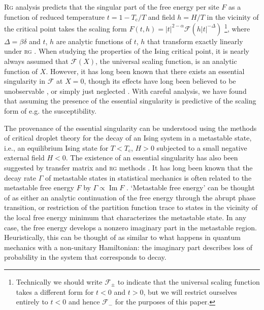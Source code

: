 \documentclass[aps,prl,reprint]{revtex4-1}
\def\im{\mathop{\mathrm{Im}}\nolimits}
\def\c{\mathrm c}
\def\fF{\mathcal F}  %
\begin{document}
\textsc{Rg} analysis predicts that the singular part of the free energy per
site $F$ as a function of reduced temperature $t=1-T_\c/T$ and field $h=H/T$ in
the vicinity of the critical point takes the scaling form
$F(t,h)=|t|^{2-\alpha}\fF(h|t|^{-\Delta})$ \footnote{Technically
we should write $\fF_{\pm}$ to indicate that the universal scaling
function takes a different form for $t<0$ and $t>0$, but we will restrict
ourselves entirely to $t<0$ and hence $\fF_-$ for the purposes of this
paper.}, where $\Delta=\beta\delta$ and $t$, $h$ are analytic functions of
$t$, $h$ that transform exactly linearly under \textsc{rg}
\cite{cardy.1996.scaling,aharony.1983.fields}. When studying the properties of
the Ising critical point, it is nearly always assumed that $\fF(X)$,
the universal scaling function, is an analytic function of $X$. However, it
has long been known that there exists an essential singularity in $\fF$
at $X=0$, though its effects have long been believed to be unobservable
\cite{fisher.1967.condensation}, or simply just neglected
\cite{guida.1997.3dising,schofield.1969.parametric,schofield.1969.correlation,caselle.2001.critical,josephson.1969.equation,fisher.1999.trigonometric}.
With careful analysis, we have found that assuming the presence of the
essential singularity is predictive of the scaling form of e.g. the
susceptibility.

The provenance of the essential singularity can be understood using the
methods of critical droplet theory for the decay of an Ising system in a
metastable state, i.e., an equilibrium Ising state for $T<T_\c$, $H>0$
subjected to a small negative external field $H<0$. The existence of an
essential singularity has also been suggested by transfer matrix
\cite{mccraw.1978.metastability,enting.1980.investigation} and \textsc{rg}
methods \cite{klein.1976.essential}.  It has long been known that the decay
rate $\Gamma$ of metastable states in statistical mechanics is often related
to the metastable free energy $F$ by $\Gamma\propto\im F$
\cite{langer.1969.metastable,penrose.1987.rigorous,gaveau.1989.analytic,privman.1982.analytic}.
`Metastable free energy' can be thought of as either an analytic continuation
of the free energy through the abrupt phase transition, or restriction of the
partition function trace to states in the vicinity of the local free energy
minimum that characterizes the metastable state. In any case, the free energy
develops a nonzero imaginary part in the metastable region. Heuristically,
this can be thought of as similar to what happens in quantum mechanics with a
non-unitary Hamiltonian: the imaginary part describes loss of probability in
the system that corresponds to decay. 
\end{document}
